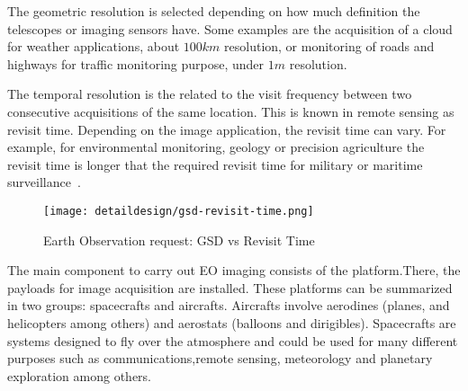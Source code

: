 

The geometric resolution is selected depending on how much definition the
telescopes or imaging sensors have. Some examples are the acquisition of a cloud
for weather applications, about $100km$ resolution, or monitoring of roads and
highways for traffic monitoring purpose, under $1m$ resolution.

The temporal resolution is the related to the visit frequency between two
consecutive acquisitions of the same location. This is known in remote sensing
as revisit time. Depending on the
image application, the revisit time can vary. For example, for environmental
monitoring, geology or precision agriculture the revisit time is longer that the
required revisit time for military or maritime surveillance~\cite{Sandau2009}.

\begin{figure}[!h]
\begin{center}
\texttt{[image: detaildesign/gsd-revisit-time.png]}
\caption{Earth Observation request: GSD vs Revisit Time}
\label{fig:intr-gsd-revisit-time}
\end{center}
\end{figure}



The main component to carry out \ac{EO} imaging consists of the platform.There, the
payloads for image acquisition are installed. These platforms can be summarized
in two groups: spacecrafts and aircrafts. Aircrafts involve aerodines (planes,
and helicopters among others) and aerostats (balloons and
dirigibles). Spacecrafts are systems designed to fly over the atmosphere and
could be used for many different purposes such as communications,remote sensing,
meteorology and planetary exploration among others.



